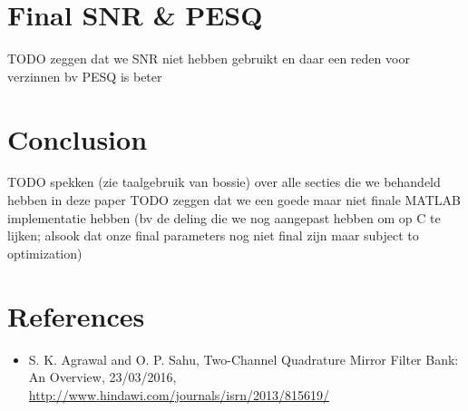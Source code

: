\documentclass[a4paper]{article}
\begin{document}
\section{Final SNR \& PESQ}
TODO zeggen dat we SNR niet hebben gebruikt en daar een reden voor verzinnen bv PESQ is beter

\section{Conclusion}
TODO spekken (zie taalgebruik van bossie) over alle secties die we behandeld hebben in deze paper
TODO zeggen dat we een goede maar niet finale MATLAB implementatie hebben (bv de deling die we nog aangepast hebben om op C te lijken; alsook dat onze final parameters nog niet final zijn maar subject to optimization)

\section{References}
\begin{itemize}
\item S. K. Agrawal and O. P. Sahu, Two-Channel Quadrature Mirror Filter Bank: An Overview, 23/03/2016, \url{http://www.hindawi.com/journals/isrn/2013/815619/}
\end{itemize}
\end{document}
